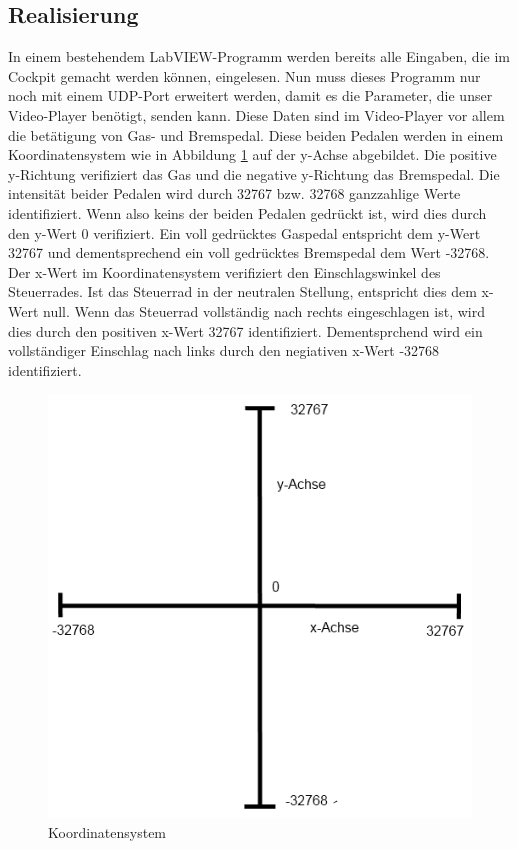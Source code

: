 \subsection{Realisierung}
In einem bestehendem LabVIEW-Programm werden bereits alle Eingaben, die im Cockpit gemacht werden können, eingelesen. Nun muss dieses Programm nur noch mit einem UDP-Port erweitert werden, damit es die Parameter, die unser Video-Player benötigt, senden kann. Diese Daten sind im Video-Player vor allem die betätigung von Gas- und Bremspedal. Diese beiden Pedalen werden in einem Koordinatensystem wie in Abbildung \ref{Koordinatensystem2} auf der y-Achse abgebildet. Die positive y-Richtung verifiziert das Gas und die negative y-Richtung das Bremspedal. Die intensität beider Pedalen wird durch 32767 bzw. 32768 ganzzahlige Werte identifiziert. Wenn also keins der beiden Pedalen gedrückt ist, wird dies durch den y-Wert 0 verifiziert. Ein voll gedrücktes Gaspedal entspricht dem y-Wert 32767 und dementsprechend ein voll gedrücktes Bremspedal dem Wert -32768. Der x-Wert im Koordinatensystem verifiziert den Einschlagswinkel des Steuerrades. Ist das Steuerrad in der neutralen Stellung, entspricht dies dem x-Wert null. Wenn das Steuerrad vollständig nach rechts eingeschlagen ist, wird dies durch den positiven x-Wert 32767 identifiziert. Dementsprchend wird ein vollständiger Einschlag nach links durch den negiativen x-Wert -32768 identifiziert. \\

\begin{figure}[H]
\centering 
\includegraphics[scale=0.5]{src/koordinatensystem.png}
\caption{Koordinatensystem} %
\label{Koordinatensystem2} %
\end{figure}

